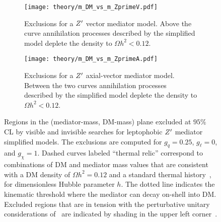\begin{figure}[htbp]
 \centering
 \begin{subfigure}[t]{0.48\textwidth}
  \centering
  \texttt{[image: theory/m\_DM\_vs\_m\_ZprimeV.pdf]}
  \caption[Exclusions for a $\Zprime$ vector mediator model.]{%
   Exclusions for a $\Zprime$ vector mediator model.
   Above the curve annihilation processes described by the simplified model deplete the density to $\Omega h^{2} < 0.12$.}
  \label{fig:m_DM_vs_m_ZprimeV}
 \end{subfigure}%
 \quad
 \begin{subfigure}[t]{0.48\textwidth}
  \centering
  \texttt{[image: theory/m\_DM\_vs\_m\_ZprimeA.pdf]}
  \caption[Exclusions for a $\Zprime$ axial-vector mediator model.]{%
   Exclusions for a $\Zprime$ axial-vector mediator model.
   Between the two curves annihilation processes described by the simplified model deplete the density to $\Omega h^{2} < 0.12$.}
  \label{fig:m_DM_vs_m_ZprimeA}
 \end{subfigure}%
 \caption[Regions in the (mediator-mass, DM-mass) plane excluded at $95\%$ CL by visible and invisible searches for leptophobic $\Zprime$ mediator simplified models with $g_{q} = 0.25$, $g_{\ell} = 0$, and $g_{\chi} = 1$.]{%
  Regions in the (mediator-mass, DM-mass) plane excluded at $95\%$ CL by visible and invisible searches for leptophobic $\Zprime$ mediator simplified models.
  The exclusions are computed for $g_{q} = 0.25$, $g_{\ell} = 0$, and $g_{\chi} = 1$.
  Dashed curves labeled ``thermal relic'' correspond to combinations of DM and mediator mass values that are consistent with a DM density of $\Omega h^{2} = 0.12$ and a standard thermal history~\cite{Baer:2014eja}, for dimensionless Hubble parameter $h$.
  The dotted line indicates the kinematic threshold where the mediator can decay on-shell into DM.
  Excluded regions that are in tension with the perturbative unitary considerations of~\cite{Kahlhoefer:2015bea} are indicated by shading in the upper left corner~\cite{EXOT-2017-32}.}
 \label{fig:m_DM_vs_m_Zprime}
\end{figure}
